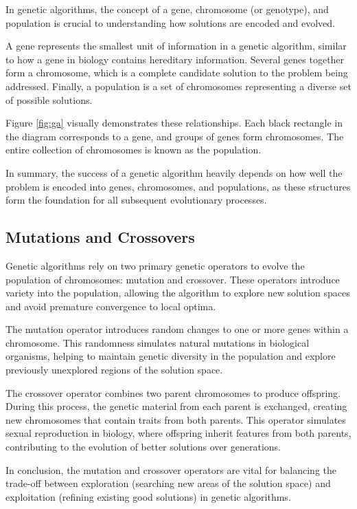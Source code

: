     In genetic algorithms, the concept of a gene, chromosome (or genotype), and population is crucial to understanding how solutions are encoded and evolved\cite{holland1992adaptation}. 
    
    A gene represents the smallest unit of information in a genetic algorithm, similar to how a gene in biology contains hereditary information. Several genes together form a chromosome, which is a complete candidate solution to the problem being addressed. Finally, a population is a set of chromosomes representing a diverse set of possible solutions.
    
    Figure \ref{fig:ga} visually demonstrates these relationships. Each black rectangle in the diagram corresponds to a gene, and groups of genes form chromosomes. The entire collection of chromosomes is known as the population.
    
    
    
    In summary, the success of a genetic algorithm heavily depends on how well the problem is encoded into genes, chromosomes, and populations, as these structures form the foundation for all subsequent evolutionary processes.
    
    \subsection{Mutations and Crossovers}
    
    Genetic algorithms rely on two primary genetic operators to evolve the population of chromosomes: mutation and crossover\cite{holland1992adaptation}. These operators introduce variety into the population, allowing the algorithm to explore new solution spaces and avoid premature convergence to local optima.
    
    The mutation operator introduces random changes to one or more genes within a chromosome. This randomness simulates natural mutations in biological organisms, helping to maintain genetic diversity in the population and explore previously unexplored regions of the solution space.
    
    The crossover operator combines two parent chromosomes to produce offspring. During this process, the genetic material from each parent is exchanged, creating new chromosomes that contain traits from both parents. This operator simulates sexual reproduction in biology, where offspring inherit features from both parents, contributing to the evolution of better solutions over generations.
    
    In conclusion, the mutation and crossover operators are vital for balancing the trade-off between exploration (searching new areas of the solution space) and exploitation (refining existing good solutions) in genetic algorithms.
